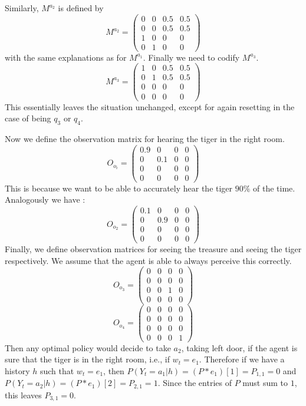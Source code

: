 \documentclass{article}
\theoremstyle{definition}
\begin{document}
Similarly, $M^{a_2}$ is defined by
\[
M^{a_2}=
\left ( \begin{matrix}
0 & 0 & 0.5 & 0.5 \\
0 & 0 & 0.5 & 0.5 \\
1 & 0 & 0 & 0 \\
0 & 1 & 0 & 0 
\end{matrix} \right)
\]
with the same explanations as for $M^{a_1}$. Finally we need to codify $M^{a_3}$. 
\[
M^{a_3}=\left ( \begin{matrix}
1 & 0 & 0.5 & 0.5 \\
0 & 1 & 0.5 & 0.5 \\
0 & 0 & 0 & 0 \\
0 & 0 & 0 & 0 
\end{matrix}
\right)
\]
This essentially leaves the situation unchanged, except for again resetting in the case of being $q_3$ or $q_4$. 

Now we define the observation matrix for hearing the tiger in the right room. 
\[
O_{o_i}=\left ( \begin{matrix} 
0.9 & 0 & 0 & 0 \\
0 & 0.1 & 0 & 0 \\ 
0 & 0 & 0 & 0 \\
0 & 0 & 0 & 0 \end{matrix} \right )
\]
This is because we want to be able to accurately hear the tiger $90\%$ of the time. Analogously we have :
\[
O_{o_2}=\left ( \begin{matrix} 
0.1 & 0 & 0 & 0 \\
0 & 0.9 & 0 & 0 \\ 
0 & 0 & 0 & 0 \\
0 & 0 & 0 & 0 \end{matrix} \right )
\]
Finally, we define observation matrices for seeing the treasure and seeing the tiger respectively. We assume that the agent is able to always perceive this correctly.
\[
O_{o_3}=\left ( \begin{matrix} 
0 & 0 & 0 & 0 \\
0 & 0 & 0 & 0 \\ 
0 & 0 & 1 & 0 \\
0 & 0 & 0 & 0 \end{matrix} \right )
\]
\[
O_{o_4}=
\left ( \begin{matrix} 
0 & 0 & 0 & 0 \\
0 & 0 & 0 & 0 \\ 
0 & 0 & 0 & 0 \\
0 & 0 & 0 & 1 \end{matrix} \right )
\]
Then any optimal policy would decide to take $a_2$, taking left door,  if the agent is sure that the tiger is in the right room, i.e., if $w_t=e_1$. Therefore if we have a history $h$ such that $w_t=e_1$, then  $P(Y_t=a_1|h)=(P*e_1)[1]=P_{1,1}=0$ and $P(Y_t=a_2|h)=(P*e_1)[2]=P_{2,1}=1$. Since the entries of $P$ must sum to $1$, this leaves $P_{3,1}=0$. 
\end{document}
